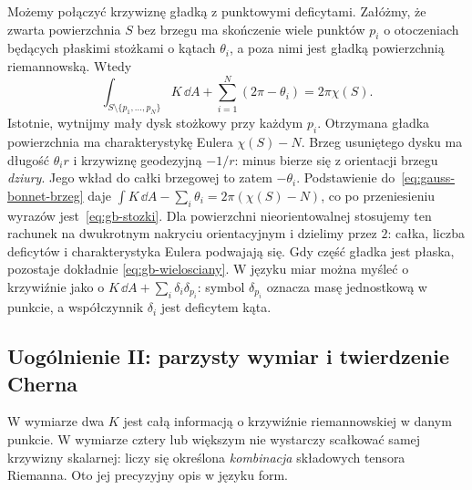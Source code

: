 Możemy połączyć krzywiznę gładką z punktowymi deficytami.
Załóżmy, że zwarta powierzchnia $S$ bez brzegu ma skończenie wiele
punktów $p_i$ o otoczeniach będących płaskimi stożkami
o kątach $\theta_i$, a poza nimi jest gładką powierzchnią
riemannowską. Wtedy
\begin{equation}\label{eq:gb-stozki}
 \boxed{\displaystyle
 \int_{S\setminus\{p_1,\ldots,p_N\}}K\,\dd A
       +\sum_{i=1}^N(2\pi-\theta_i)
       =2\pi\chi(S).}
\end{equation}
Istotnie, wytnijmy mały dysk stożkowy przy każdym $p_i$.
Otrzymana gładka powierzchnia ma charakterystykę Eulera
$\chi(S)-N$. Brzeg usuniętego dysku ma długość
$\theta_i r$ i krzywiznę geodezyjną $-1/r$:
minus bierze się z orientacji brzegu \emph{dziury}.
Jego wkład do całki brzegowej to zatem $-\theta_i$.
Podstawienie do~\eqref{eq:gauss-bonnet-brzeg} daje
$\int K\,\dd A-\sum_i\theta_i=2\pi(\chi(S)-N)$,
co po przeniesieniu wyrazów jest~\eqref{eq:gb-stozki}.
Dla powierzchni nieorientowalnej stosujemy ten rachunek
na dwukrotnym nakryciu orientacyjnym i dzielimy przez $2$:
całka, liczba deficytów i charakterystyka Eulera podwajają się.
Gdy część gładka jest płaska, pozostaje dokładnie
\eqref{eq:gb-wielosciany}. W języku miar można myśleć
o krzywiźnie jako o $K\,\dd A+\sum_i\delta_i\delta_{p_i}$:
symbol $\delta_{p_i}$ oznacza masę jednostkową w punkcie,
a współczynnik $\delta_i$ jest deficytem kąta.

\subsection*{Uogólnienie II: parzysty wymiar i twierdzenie Cherna}

W wymiarze dwa $K$ jest całą informacją o krzywiźnie
riemannowskiej w danym punkcie. W wymiarze cztery lub
większym nie wystarczy scałkować samej krzywizny skalarnej:
liczy się określona \emph{kombinacja} składowych tensora
Riemanna. Oto jej precyzyjny opis w języku form.

